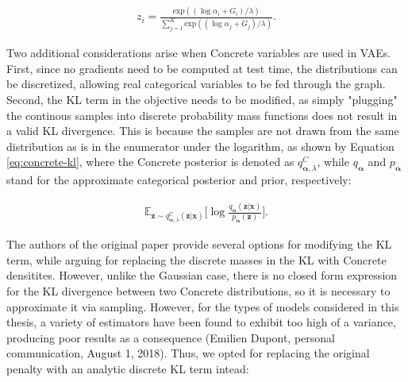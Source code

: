 \documentclass{report}
\begin{document}
\begin{equation}
\begin{gathered}
z_i = \frac{\text{exp}((\log \alpha_i + G_i) / \lambda)}{\sum_{j=1}^K \text{exp}((\log \alpha_j + G_j) / \lambda)}.
\end{gathered}
\label{eq:gumbel-softmax}
\end{equation}

\bigskip

\noindent Two additional considerations arise when Concrete variables are used in VAEs. First, since no gradients need to be computed at test time, the distributions can be discretized, allowing real categorical variables to be fed through the graph. Second, the KL term in the objective needs to be modified, as simply "plugging" the continous samples into discrete probability mass functions does not result in a valid KL divergence. This is because the samples are not drawn from the same distribution as is in the enumerator under the logarithm, as shown by Equation \ref{eq:concrete-kl}, where the Concrete posterior is denoted as $q_{\boldsymbol{\alpha}, \lambda}^C$, while $q_{\boldsymbol{\alpha}}$ and $p_{\boldsymbol{\alpha}}$ stand for the approximate categorical posterior and prior, respectively:

\begin{equation}
\begin{gathered}
\mathbb{E}_{\boldsymbol{z} \sim q^{\text{C}}_{\boldsymbol{\alpha}, \lambda}(\boldsymbol{z} | \boldsymbol{x})} \Big[ \log \frac{q_{\boldsymbol{\alpha}}(\boldsymbol{z} | \boldsymbol{x})}{p_{\boldsymbol{\alpha}} (\boldsymbol{z})} \Big].
\end{gathered}
\label{eq:concrete-kl}
\end{equation}

\bigskip

\noindent The authors of the original paper \cite{concrete} provide several options for modifying the KL term, while arguing for replacing the discrete masses in the KL with Concrete densitites. However, unlike the Gaussian case, there is no closed form expression for the KL divergence between two Concrete distributions, so it is necessary to approximate it via sampling. However, for the types of models considered in this thesis, a variety of estimators have been found to exhibit too high of a variance, producing poor results as a consequence (Emilien Dupont, personal communication, August 1, 2018). Thus, we opted for replacing the original penalty with an analytic discrete KL term intead:
\end{document}
